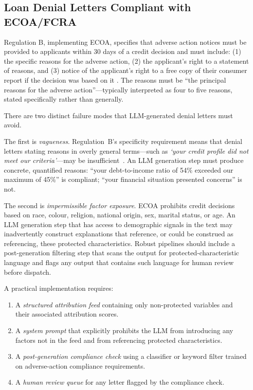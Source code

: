 \subsection{Loan Denial Letters Compliant with ECOA/FCRA}
\label{sec:ch12-loan-denial-letters}

Regulation B, implementing ECOA, specifies that adverse action notices must be provided
to applicants within 30 days of a credit decision and must include: (1) the specific
reasons for the adverse action, (2) the applicant's right to a statement of reasons, and
(3) notice of the applicant's right to a free copy of their consumer report if the
decision was based on it \cite{cfpb2013ecoa}. The reasons must be ``the principal reasons
for the adverse action''---typically interpreted as four to five reasons, stated
specifically rather than generally.

There are two distinct failure modes that LLM-generated denial letters must avoid.

The first is \emph{vagueness}. Regulation~B's specificity requirement means that denial letters stating reasons in overly general terms---such as \emph{`your credit profile did not meet our criteria'}---may be insufficient~\citep{cfpb2013ecoa}. An LLM generation step must produce concrete,
quantified reasons: ``your debt-to-income ratio of 54\% exceeded our maximum of 45\%''
is compliant; ``your financial situation presented concerns'' is not.

The second is \emph{impermissible factor exposure}. ECOA prohibits credit decisions based
on race, colour, religion, national origin, sex, marital status, or age. An LLM generation
step that has access to demographic signals in the text may inadvertently construct
explanations that reference, or could be construed as referencing, these protected
characteristics. Robust pipelines should include a post-generation filtering step that
scans the output for protected-characteristic language and flags any output that contains
such language for human review before dispatch.

A practical implementation requires:
\begin{enumerate}
  \item A \emph{structured attribution feed} containing only non-protected variables and
        their associated attribution scores.
  \item A \emph{system prompt} that explicitly prohibits the LLM from introducing any
        factors not in the feed and from referencing protected characteristics.
  \item A \emph{post-generation compliance check} using a classifier or keyword filter
        trained on adverse-action compliance requirements.
  \item A \emph{human review queue} for any letter flagged by the compliance check.
\end{enumerate}

